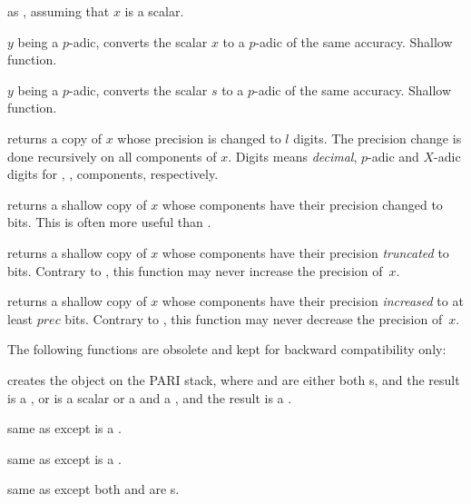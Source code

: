  as , assuming that $x$
is a scalar.

 $y$ being a $p$-adic, converts the scalar $x$
to a $p$-adic of the same accuracy. Shallow function.

 $y$ being a $p$-adic, converts the scalar $s$
to a $p$-adic of the same accuracy. Shallow function.

 returns a copy of $x$ whose precision is
changed to $l$ digits. The precision change is done recursively on all
components of $x$. Digits means \emph{decimal}, $p$-adic and $X$-adic digits
for , ,  components, respectively.

 returns a shallow copy of $x$ whose
 components have their precision changed to  bits.
This is often more useful than .

 returns a shallow copy of $x$ whose
 components have their precision \emph{truncated} to 
bits. Contrary to , this function may never increase
the precision of~$x$.

 returns a shallow copy of $x$ whose
 components have their precision \emph{increased} to at least $prec$
bits. Contrary to , this function may never decrease
the precision of~$x$.

The following functions are obsolete and kept for backward compatibility only:




 creates the object  on
the PARI stack, where  and  are either both s, and the
result is a , or  is a scalar or a  and  a
, and the result is a .

 same as  except  is a
.

 same as  except  is a
.

 same as  except both
 and  are s.

